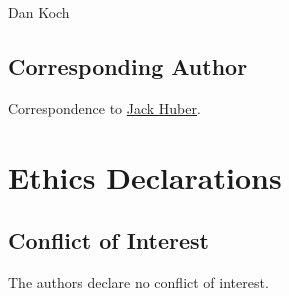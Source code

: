 \documentclass[
]{article}
\begin{document}
Dan Koch

\hypertarget{corresponding-author}{%
\subsection{Corresponding Author}\label{corresponding-author}}

Correspondence to \href{mailto:jack.bernard.huber@gmail.com}{Jack Huber}.

\hypertarget{ethics-declarations}{%
\section{Ethics Declarations}\label{ethics-declarations}}

\hypertarget{conflict-of-interest}{%
\subsection{Conflict of Interest}\label{conflict-of-interest}}

The authors declare no conflict of interest.

  
\end{document}

